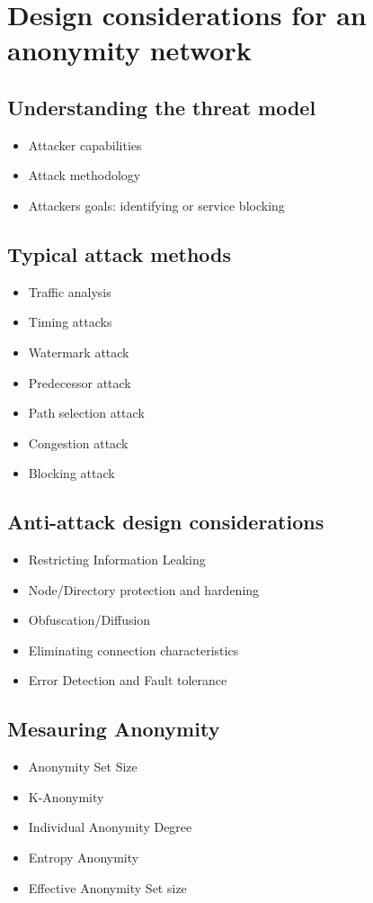 \documentclass{llncs}
\begin{document}
\section{Design considerations for an anonymity network} \label{design}
\subsection{Understanding the threat model}
\begin{itemize}
	\item{Attacker capabilities}
	\item{Attack methodology}
	\item{Attackers goals: identifying or service blocking}
\end{itemize}
\subsection{Typical attack methods}
\begin{itemize}
	\item{Traffic analysis}
	\item{Timing attacks}
	\item{Watermark attack}
	\item{Predecessor attack}
	\item{Path selection attack}
	\item{Congestion attack}
	\item{Blocking attack}
\end{itemize}
\subsection{Anti-attack design considerations}
\begin{itemize}
	\item{Restricting Information Leaking}
	\item{Node/Directory protection and hardening}
	\item{Obfuscation/Diffusion}
	\item{Eliminating connection characteristics}
	\item{Error Detection and Fault tolerance}
\end{itemize}
\subsection{Mesauring Anonymity}
\begin{itemize}
	\item{Anonymity Set Size}
	\item{K-Anonymity}
	\item{Individual Anonymity Degree}
	\item{Entropy Anonymity}
	\item{Effective Anonymity Set size}
\end{itemize}
\end{document}
